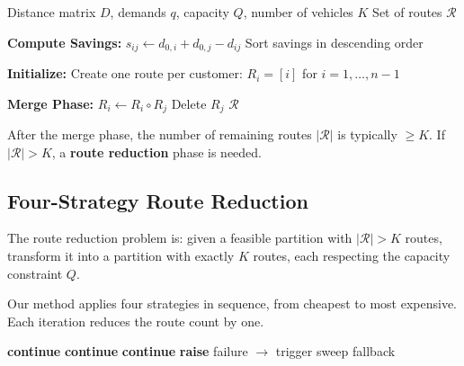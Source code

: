 \documentclass[12pt,a4paper]{article}
\theoremstyle{definition}
\begin{document}
\begin{algorithm}[H]
\caption{Clarke-Wright Savings Algorithm --- Standard Phase}
\begin{algorithmic}[1]
\Require Distance matrix $D$, demands $q$, capacity $Q$, number of vehicles $K$
\Ensure Set of routes $\mathcal{R}$

\State \textbf{Compute Savings:}
        \State $s_{ij} \gets d_{0,i} + d_{0,j} - d_{ij}$
    \EndFor
\EndFor
\State Sort savings in descending order

\State \textbf{Initialize:} Create one route per customer: $R_i = [i]$ for $i = 1, \ldots, n-1$

\State \textbf{Merge Phase:}
            \State $R_i \gets R_i \circ R_j$ 
            \State Delete $R_j$
        \EndIf
    \EndIf
\EndFor
\State \Return $\mathcal{R}$
\end{algorithmic}
\end{algorithm}

After the merge phase, the number of remaining routes $|\mathcal{R}|$ is typically $\geq K$. If $|\mathcal{R}| > K$, a \textbf{route reduction} phase is needed.

\subsection{Four-Strategy Route Reduction}

\label{sec:reduce}

The route reduction problem is: given a feasible partition with $|\mathcal{R}| > K$ routes, transform it into a partition with exactly $K$ routes, each respecting the capacity constraint $Q$.

Our method applies four strategies in sequence, from cheapest to most expensive. Each iteration reduces the route count by one.

\begin{algorithm}[H]
\caption{Multi-Strategy Route Reduction}
\begin{algorithmic}[1]
        \State \textbf{continue}
        \State \textbf{continue}
        \State \textbf{continue}
        \State \Return {}
    \Else
        \State \textbf{raise} failure $\to$ trigger sweep fallback
    \EndIf
\EndWhile
\end{algorithmic}
\end{algorithm}
\end{document}

